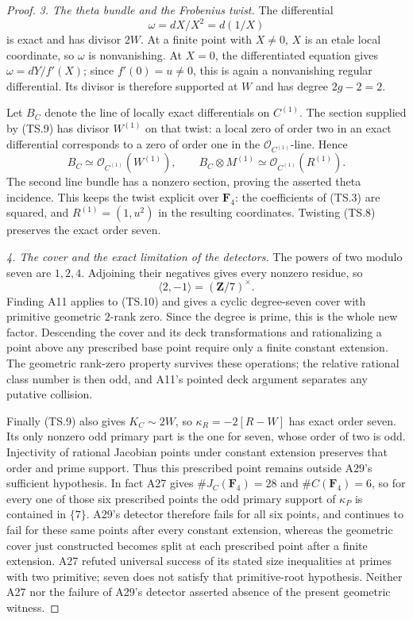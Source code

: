 \documentclass[11pt,a4paper]{article}
\begin{document}
\begin{proof}
\emph{3. The theta bundle and the Frobenius twist.}
The differential
\[
                    \omega=dX/X^2=d(1/X)
 \tag{TS.9}
\]
is exact and has divisor $2W$.  At a finite point with $X\ne0$,
$X$ is an etale local coordinate, so $\omega$ is nonvanishing.
At $X=0$, the differentiated equation gives
$\omega=dY/f'(X)$; since $f'(0)=u\ne0$, this is again a
nonvanishing regular differential.  Its divisor is therefore
supported at $W$ and has degree $2g-2=2$.

Let $B_C$ denote the line of locally exact differentials on
$C^{(1)}$.  The section supplied by (TS.9) has divisor
$W^{(1)}$ on that twist: a local zero of order two in an exact
differential corresponds to a zero of order one in the
$\mathcal O_{C^{(1)}}$-line.  Hence
\[
 B_C\simeq\mathcal O_{C^{(1)}}(W^{(1)}),\qquad
 B_C\otimes M^{(1)}
       \simeq\mathcal O_{C^{(1)}}(R^{(1)}).
 \tag{TS.10}
\]
The second line bundle has a nonzero section, proving the asserted
theta incidence.  This keeps the twist explicit over $\mathbf F_4$:
the coefficients of (TS.3) are squared, and
$R^{(1)}=(1,u^2)$ in the resulting coordinates.
Twisting (TS.8) preserves the exact order seven.

\emph{4. The cover and the exact limitation of the detectors.}
The powers of two modulo seven are $1,2,4$.  Adjoining their
negatives gives every nonzero residue, so
\[
                  \langle2,-1\rangle=(\mathbf Z/7)^\times.
 \tag{TS.11}
\]
Finding A11 applies to (TS.10) and gives a cyclic degree-seven
cover with primitive geometric $2$-rank zero.  Since the degree
is prime, this is the whole new factor.  Descending the cover and
its deck transformations and rationalizing a point above any
prescribed base point require only a finite constant extension.
The geometric rank-zero property survives these operations; the
relative rational class number is then odd, and A11's pointed
deck argument separates any putative collision.

Finally (TS.9) also gives $K_C\sim2W$, so
$\kappa_R=-2[R-W]$ has exact order seven.  Its only nonzero odd
primary part is the one for seven, whose order of two is odd.
Injectivity of rational Jacobian points under constant extension
preserves that order and prime support.  Thus this prescribed
point remains outside A29's sufficient hypothesis.  In fact A27
gives $\#J_C(\mathbf F_4)=28$ and $\#C(\mathbf F_4)=6$, so for
every one of those six prescribed points the odd primary support
of $\kappa_P$ is contained in $\{7\}$.  A29's detector therefore
fails for all six points, and continues to fail for these same
points after every constant extension, whereas the geometric
cover just constructed becomes split at each prescribed point
after a finite extension.  A27 refuted
universal success of its stated size inequalities at primes with
two primitive; seven does not satisfy that primitive-root
hypothesis.  Neither A27 nor the failure of A29's detector
asserted absence of the present geometric witness.
\end{proof}
\end{document}
